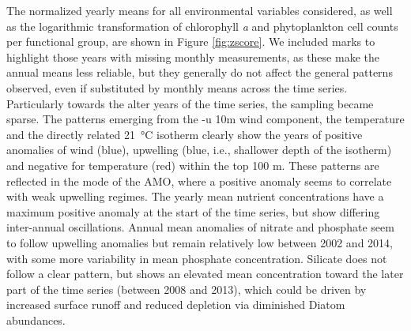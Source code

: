 \documentclass[draft]{agujournal2019}
\begin{document}
The normalized yearly means for all environmental variables considered, as well as the logarithmic transformation of chlorophyll \textit{a} and phytoplankton cell counts per functional group, are shown in Figure \ref{fig:zscore}. We included marks to highlight those years with missing monthly measurements, as these make the annual means less reliable, but they generally do not affect the general patterns observed, even if substituted by monthly means across the time series. Particularly towards the alter years of the time series, the sampling became sparse. The patterns emerging from the -u 10m wind component, the temperature and the directly related \qty{21}{\celsius} isotherm clearly show the years of positive anomalies of wind (blue), upwelling (blue, i.e., shallower depth of the isotherm) and negative for temperature (red) within the top 100 m. These patterns are reflected in the mode of the AMO, where a positive anomaly seems to correlate with weak upwelling regimes. The yearly mean nutrient concentrations have a maximum positive anomaly at the start of the time series, but show differing inter-annual oscillations. Annual mean anomalies of nitrate and phosphate seem to follow upwelling anomalies but remain relatively low between 2002 and 2014, with some more variability in mean phosphate concentration. Silicate does not follow a clear pattern, but shows an elevated mean concentration toward the later part of the time series (between 2008 and 2013), which could be driven by increased surface runoff \cite{lorenzoni_characterization_2015} and reduced depletion via diminished Diatom abundances.
\end{document}
